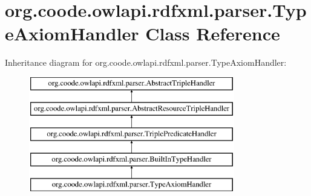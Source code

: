 \hypertarget{classorg_1_1coode_1_1owlapi_1_1rdfxml_1_1parser_1_1_type_axiom_handler}{\section{org.\-coode.\-owlapi.\-rdfxml.\-parser.\-Type\-Axiom\-Handler Class Reference}
\label{classorg_1_1coode_1_1owlapi_1_1rdfxml_1_1parser_1_1_type_axiom_handler}
}
Inheritance diagram for org.\-coode.\-owlapi.\-rdfxml.\-parser.\-Type\-Axiom\-Handler\-:\begin{figure}[H]
\begin{center}
\leavevmode
\includegraphics[height=5.000000cm]{classorg_1_1coode_1_1owlapi_1_1rdfxml_1_1parser_1_1_type_axiom_handler}
\end{center}
\end{figure}
